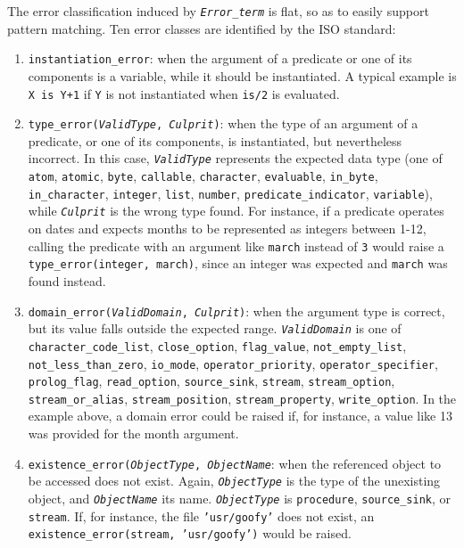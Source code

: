 The error classification induced by \texttt{\textit{Error\_term}} is flat, so as to easily support
pattern matching. Ten error classes are identified by the ISO standard:
\begin{enumerate}
  \item \texttt{instantiation\_error}: when the argument of a predicate or one of its
      components is a variable, while it should be instantiated. A typical example is
      \texttt{X is Y+1} if \texttt{Y} is not instantiated when \texttt{is/2} is evaluated.

  \item \texttt{type\_error(\textit{ValidType}, \textit{Culprit})}: when the type of an
      argument of a predicate, or one of its components, is instantiated, but nevertheless
      incorrect. In this case, \texttt{\textit{ValidType}} represents the expected data type
      (one of \texttt{atom}, \texttt{atomic}, \texttt{byte}, \texttt{callable},
      \texttt{character}, \texttt{evaluable}, \texttt{in\_byte}, \texttt{in\_character},
      \texttt{integer}, \texttt{list}, \texttt{number}, \texttt{predicate\_indicator},
      \texttt{variable}), while \texttt{\textit{Culprit}} is the wrong type found. For
      instance, if a predicate operates on dates and expects months to be represented as
      integers between 1-12, calling the predicate with an argument like \texttt{march}
      instead of \texttt{3} would raise a \texttt{type\_error(integer, march)}, since an
      integer was expected and \texttt{march} was found instead.

  \item \texttt{domain\_error(\textit{ValidDomain}, \textit{Culprit})}: when the argument type
      is correct, but its value falls outside the expected range.
      \texttt{\textit{ValidDomain}} is one of \texttt{character\_code\_list},
      \texttt{close\_option}, \texttt{flag\_value}, \texttt{not\_empty\_list},
      \texttt{not\_less\_than\_zero}, \texttt{io\_mode}, \texttt{operator\_priority},
      \texttt{operator\_specifier}, \texttt{prolog\_flag}, \texttt{read\_option},
      \texttt{source\_sink}, \texttt{stream}, \texttt{stream\_option},\\
      \texttt{stream\_or\_alias}, \texttt{stream\_position}, \texttt{stream\_property},
      \texttt{write\_option}. In the example above, a domain error could be raised if, for
      instance, a value like 13 was provided for the month argument.

  \item \texttt{existence\_error(\textit{ObjectType}, \textit{ObjectName}}: when the
      referenced object to be accessed does not exist. Again, \texttt{\textit{ObjectType}} is
      the type of the unexisting object, and \texttt{\textit{ObjectName}} its name.
      \texttt{\textit{ObjectType}} is \texttt{procedure}, \texttt{source\_sink}, or
      \texttt{stream}. If, for instance, the file \texttt{'usr/goofy'} does not exist, an
      \texttt{existence\_error(stream, 'usr/goofy')} would be raised.


\end{enumerate}
